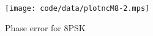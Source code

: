 \documentclass[journal]{IEEEtran}
\begin{document}
\begin{figure}[tp]
	\centering
		\texttt{[image: code/data/plotncM8-2.mps]}
		\caption{Phase error for 8PSK}
		\label{fig:plotphase}
\end{figure}





\end{document}
